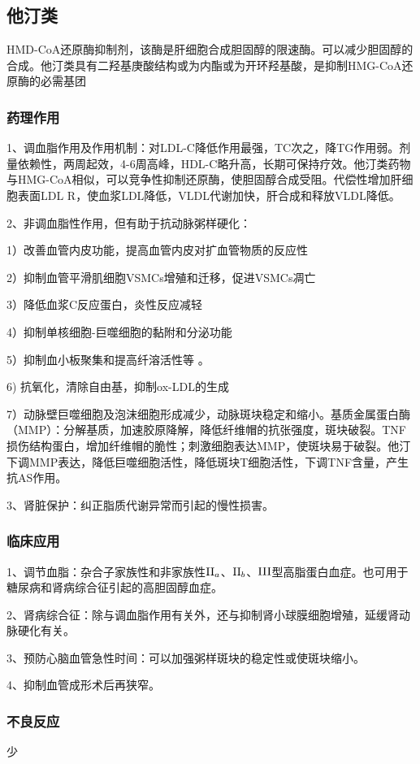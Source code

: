 \documentclass[UTF8]{ctexbook}
\begin{document}
\subsection{他汀类}HMD-CoA还原酶抑制剂，该酶是肝细胞合成胆固醇的限速酶。可以减少胆固醇的合成。他汀类具有二羟基庚酸结构或为内酯或为开环羟基酸，是抑制HMG-CoA还原酶的必需基团
\subsubsection{药理作用}
1、调血脂作用及作用机制：对LDL-C降低作用最强，TC次之，降TG作用弱。剂量依赖性，两周起效，4-6周高峰，HDL-C略升高，长期可保持疗效。他汀类药物与HMG-CoA相似，可以竞争性抑制还原酶，使胆固醇合成受阻。代偿性增加肝细胞表面LDL R，使血浆LDL降低，VLDL代谢加快，肝合成和释放VLDL降低。

2、非调血脂性作用，但有助于抗动脉粥样硬化：

1）改善血管内皮功能，提高血管内皮对扩血管物质的反应性

2）抑制血管平滑肌细胞VSMCs增殖和迁移，促进VSMCs凋亡

3）降低血浆C反应蛋白，炎性反应减轻

4）抑制单核细胞-巨噬细胞的黏附和分泌功能

5）抑制血小板聚集和提高纤溶活性等 。

6) 抗氧化，清除自由基，抑制ox-LDL的生成

7）动脉壁巨噬细胞及泡沫细胞形成减少，动脉斑块稳定和缩小。基质金属蛋白酶（MMP）：分解基质，加速胶原降解，降低纤维帽的抗张强度，斑块破裂。TNF损伤结构蛋白，增加纤维帽的脆性；刺激细胞表达MMP，使斑块易于破裂。他汀下调MMP表达，降低巨噬细胞活性，降低斑块T细胞活性，下调TNF含量，产生抗AS作用。

3、肾脏保护：纠正脂质代谢异常而引起的慢性损害。
\subsubsection{临床应用}
1、调节血脂：杂合子家族性和非家族性\(\textup{II}_{a}\)、\(\textup{II}_{b}\)、\(\textup{III}\)型高脂蛋白血症。也可用于糖尿病和肾病综合征引起的高胆固醇血症。

2、肾病综合征：除与调血脂作用有关外，还与抑制肾小球膜细胞增殖，延缓肾动脉硬化有关。

3、预防心脑血管急性时间：可以加强粥样斑块的稳定性或使斑块缩小。

4、抑制血管成形术后再狭窄。
\subsubsection{不良反应}少
\end{document}
